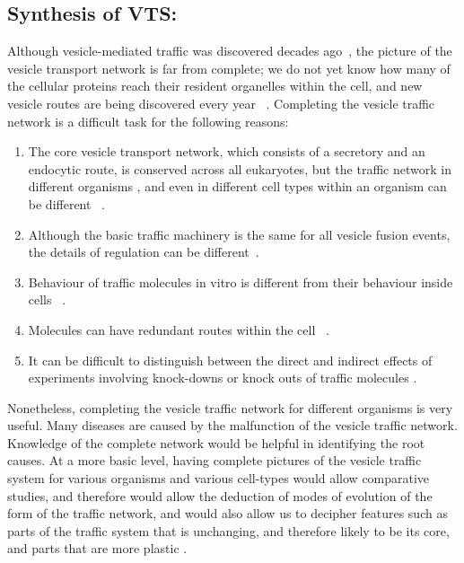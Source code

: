 \subsection{Synthesis of VTS:}
Although vesicle-mediated traffic was discovered decades ago~\cite{wells2005discovery}, the picture of the vesicle transport network is far from complete; we do not yet know how many of the cellular proteins reach their resident organelles within the cell, and new vesicle routes are being discovered every year ~\cite{nickel2018unconventional,weill2018toolbox}. 
%
Completing the vesicle traffic network is a difficult task for the following reasons: 
\begin{enumerate}
	\item The core vesicle transport network, which consists of a secretory and an endocytic route, is conserved across all eukaryotes, but the traffic network in different organisms \cite{richardson2015evolutionary,nishimoto2009differential,barlow2017seeing}, and even in different cell types within an organism can be different ~\cite{stoops2014trafficking,zhou2015arp2}.
	
	\item Although the basic traffic machinery is the same for all vesicle fusion events, the details of regulation can be different~\cite{davletov2007regulation,di2010calcium}.
	
	\item Behaviour of traffic molecules in vitro is different from their behaviour inside cells ~\cite{furukawa2014multiple}.
	
	\item Molecules can have redundant routes within the cell ~\cite{shimizu2014compensatory,nakatsukasa2014nutrient}.
	
	\item It can be difficult to distinguish between the direct and indirect effects of experiments involving knock-downs or knock outs of traffic molecules \cite{hirst2004epsinr,mishev2013small}.
\end{enumerate}

Nonetheless, completing the vesicle traffic network for different organisms is very useful. Many diseases are caused by the malfunction of the vesicle traffic network. Knowledge of the complete network would be helpful in identifying the root causes\cite{bexiga2013human,gissen2007cargos}. At a more basic level, having complete pictures of the vesicle traffic system for various organisms and various cell-types would allow comparative studies, and therefore would allow the deduction of modes of evolution of the form of the traffic network, and would also allow us to decipher features such as parts of the traffic system that is unchanging, and therefore likely to be its core, and parts that are more plastic \cite{barlow2017seeing}.

